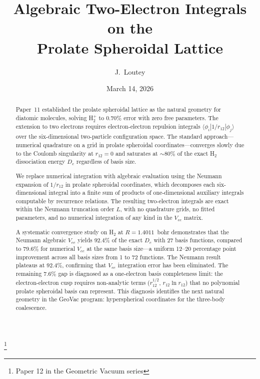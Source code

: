 \documentclass[aps,pra,twocolumn,superscriptaddress,longbibliography]{revtex4-2}
\begin{document}
\title{Algebraic Two-Electron Integrals on the\\
Prolate Spheroidal Lattice}
\thanks{Paper 12 in the Geometric Vacuum series}

\author{J.~Loutey}

\date{March 14, 2026}


\begin{abstract}
Paper~11 established the prolate spheroidal lattice as the natural
geometry for diatomic molecules, solving H$_2^+$ to 0.70\% error
with zero free parameters.  The extension to two electrons requires
electron-electron repulsion integrals $\langle\phi_i|1/r_{12}|\phi_j\rangle$
over the six-dimensional two-particle configuration space.  The
standard approach---numerical quadrature on a grid in prolate
spheroidal coordinates---converges slowly due to the Coulomb
singularity at $r_{12} = 0$ and saturates at $\sim$80\% of the
exact H$_2$ dissociation energy $D_e$ regardless of basis size.

We replace numerical integration with algebraic evaluation using
the Neumann expansion of $1/r_{12}$ in prolate spheroidal
coordinates, which decomposes each six-dimensional integral into a
finite sum of products of one-dimensional auxiliary integrals
computable by recurrence relations.  The resulting two-electron
integrals are exact within the Neumann truncation order $L$, with
no quadrature grids, no fitted parameters, and no numerical
integration of any kind in the $V_{ee}$ matrix.

A systematic convergence study on H$_2$ at $R = 1.4011$~bohr
demonstrates that the Neumann algebraic $V_{ee}$ yields 92.4\% of
the exact $D_e$ with 27 basis functions, compared to 79.6\% for
numerical $V_{ee}$ at the same basis size---a uniform 12--20
percentage point improvement across all basis sizes from 1 to 72
functions.  The Neumann result plateaus at 92.4\%, confirming that
$V_{ee}$ integration error has been eliminated.  The remaining
7.6\% gap is diagnosed as a one-electron basis completeness limit:
the electron-electron cusp requires non-analytic terms
($r_{12}^{1/2}$, $r_{12}\ln r_{12}$) that no polynomial prolate
spheroidal basis can represent.  This diagnosis identifies the next
natural geometry in the GeoVac program: hyperspherical coordinates
for the three-body coalescence.
\end{abstract}
\end{document}
